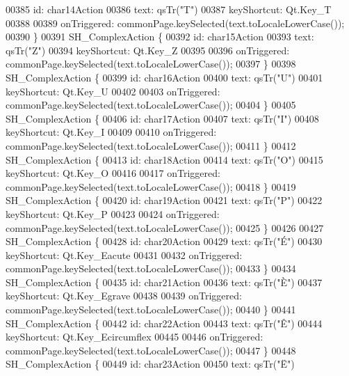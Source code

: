 \begin{DoxyCode}
00385         \textcolor{keywordtype}{id}: char14Action
00386         text: qsTr(\textcolor{stringliteral}{"T"})
00387         keyShortcut: Qt.Key\_T
00388 
00389         onTriggered: commonPage.keySelected(text.toLocaleLowerCase());
00390     \}
00391     SH\_ComplexAction \{
00392         \textcolor{keywordtype}{id}: char15Action
00393         text: qsTr(\textcolor{stringliteral}{"Z"})
00394         keyShortcut: Qt.Key\_Z
00395 
00396         onTriggered: commonPage.keySelected(text.toLocaleLowerCase());
00397     \}
00398     SH\_ComplexAction \{
00399         \textcolor{keywordtype}{id}: char16Action
00400         text: qsTr(\textcolor{stringliteral}{"U"})
00401         keyShortcut: Qt.Key\_U
00402 
00403         onTriggered: commonPage.keySelected(text.toLocaleLowerCase());
00404     \}
00405     SH\_ComplexAction \{
00406         \textcolor{keywordtype}{id}: char17Action
00407         text: qsTr(\textcolor{stringliteral}{"I"})
00408         keyShortcut: Qt.Key\_I
00409 
00410         onTriggered: commonPage.keySelected(text.toLocaleLowerCase());
00411     \}
00412     SH\_ComplexAction \{
00413         \textcolor{keywordtype}{id}: char18Action
00414         text: qsTr(\textcolor{stringliteral}{"O"})
00415         keyShortcut: Qt.Key\_O
00416 
00417         onTriggered: commonPage.keySelected(text.toLocaleLowerCase());
00418     \}
00419     SH\_ComplexAction \{
00420         \textcolor{keywordtype}{id}: char19Action
00421         text: qsTr(\textcolor{stringliteral}{"P"})
00422         keyShortcut: Qt.Key\_P
00423 
00424         onTriggered: commonPage.keySelected(text.toLocaleLowerCase());
00425     \}
00426 
00427     SH\_ComplexAction \{
00428         \textcolor{keywordtype}{id}: char20Action
00429         text: qsTr(\textcolor{stringliteral}{"É"})
00430         keyShortcut: Qt.Key\_Eacute
00431 
00432         onTriggered: commonPage.keySelected(text.toLocaleLowerCase());
00433     \}
00434     SH\_ComplexAction \{
00435         \textcolor{keywordtype}{id}: char21Action
00436         text: qsTr(\textcolor{stringliteral}{"È"})
00437         keyShortcut: Qt.Key\_Egrave
00438 
00439         onTriggered: commonPage.keySelected(text.toLocaleLowerCase());
00440     \}
00441     SH\_ComplexAction \{
00442         \textcolor{keywordtype}{id}: char22Action
00443         text: qsTr(\textcolor{stringliteral}{"Ê"})
00444         keyShortcut: Qt.Key\_Ecircumflex
00445 
00446         onTriggered: commonPage.keySelected(text.toLocaleLowerCase());
00447     \}
00448     SH\_ComplexAction \{
00449         \textcolor{keywordtype}{id}: char23Action
00450         text: qsTr(\textcolor{stringliteral}{"Ë"})

\end{DoxyCode}
